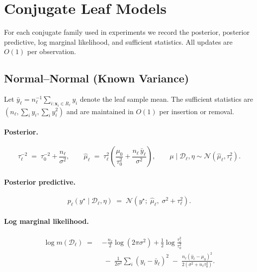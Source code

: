 \documentclass[twoside,11pt]{article}
\begin{document}

\newpage



\newpage

\appendix

\section{Conjugate Leaf Models}\label{app:conjugate_updates}

For each conjugate family used in experiments we record the posterior,
posterior predictive, log marginal likelihood, and sufficient statistics.
All updates are $O(1)$ per observation.

\subsection{Normal--Normal (Known Variance)}\label{app:conjugate_normal}

Let $\bar{y}_\ell = n_\ell^{-1}\sum_{i:\mathbf{x}_i\in R_\ell} y_i$ denote the leaf sample mean. The sufficient statistics are $(n_\ell, \sum_i y_i, \sum_i y_i^2)$ and are maintained in $O(1)$ per insertion or removal.

\paragraph{Posterior.}
\begin{equation}\label{eq:normal_posterior}
\tau_\ell^{-2} \;=\; \tau_0^{-2} + \frac{n_\ell}{\sigma^2},
\qquad
\hat{\mu}_\ell \;=\; \tau_\ell^{2}\!\left(\frac{\mu_0}{\tau_0^2} + \frac{n_\ell\,\bar{y}_\ell}{\sigma^2}\right),
\qquad
\mu \mid \mathcal{D}_\ell,\eta \sim \mathcal{N}(\hat{\mu}_\ell,\tau_\ell^2).
\end{equation}

\paragraph{Posterior predictive.}
\begin{equation}\label{eq:normal_predictive}
p_\ell(y^\star \mid \mathcal{D}_\ell,\eta) \;=\; \mathcal{N}\!\left(y^\star;\; \hat{\mu}_\ell,\; \sigma^2 + \tau_\ell^2\right).
\end{equation}

\paragraph{Log marginal likelihood.}
\begin{equation}\label{eq:normal_log_marginal}
\begin{aligned}
\log m(\mathcal{D}_\ell)
\;=\;& -\frac{n_\ell}{2}\log(2\pi\sigma^2) + \frac{1}{2}\log\!\frac{\tau_\ell^2}{\tau_0^2} \\
&\;-\;\frac{1}{2\sigma^2}\sum_{i}\!\left(y_i - \bar{y}_\ell\right)^2
\;-\;\frac{n_\ell(\bar{y}_\ell - \mu_0)^2}{2(\sigma^2 + n_\ell\tau_0^2)}.
\end{aligned}
\end{equation}
\end{document}
